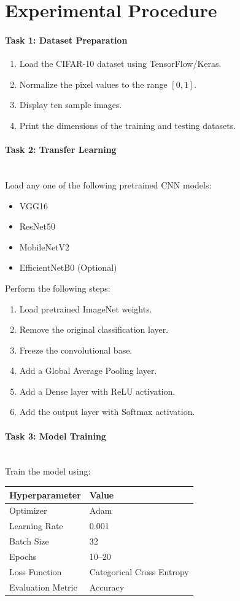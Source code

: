 \documentclass[11pt]{article}
\begin{document}
\section{Experimental Procedure}
\paragraph{Task 1: Dataset Preparation}
\begin{enumerate}
    \item Load the CIFAR-10 dataset using TensorFlow/Keras.
    \item Normalize the pixel values to the range $[0, 1]$.
    \item Display ten sample images.
    \item Print the dimensions of the training and testing datasets.
\end{enumerate}

\paragraph{Task 2: Transfer Learning}\hfill\\
Load any one of the following pretrained CNN models:
\begin{itemize}
    \item VGG16
    \item ResNet50
    \item MobileNetV2
    \item EfficientNetB0 (Optional)
\end{itemize}
Perform the following steps:
\begin{enumerate}
    \item Load pretrained ImageNet weights.
    \item Remove the original classification layer.
    \item Freeze the convolutional base.
    \item Add a Global Average Pooling layer.
    \item Add a Dense layer with ReLU activation.
    \item Add the output layer with Softmax activation.
\end{enumerate}

\paragraph{Task 3: Model Training}\hfill\\
Train the model using:
\begin{table}[H]
\centering
\begin{tabular}{|l|l|}
\hline
\textbf{Hyperparameter} & \textbf{Value} \\ \hline
Optimizer & Adam \\ \hline
Learning Rate & 0.001 \\ \hline
Batch Size & 32 \\ \hline
Epochs & 10–20 \\ \hline
Loss Function & Categorical Cross Entropy \\ \hline
Evaluation Metric & Accuracy \\ \hline
\end{tabular}
\end{table}
\end{document}
